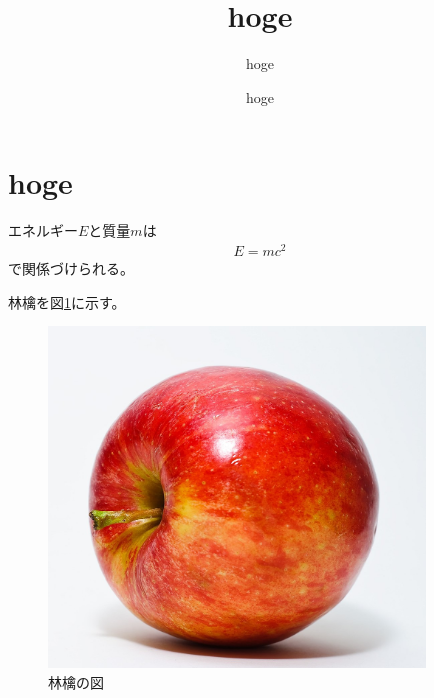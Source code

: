 \documentclass[uplatex]{jsarticle}
\title{hoge}
\author{hoge}
\date{hoge}
\begin{document}
\maketitle

\section{hoge}

エネルギー$E$と質量$m$は
\begin{align}
    E = mc^2
\end{align}
で関係づけられる。

林檎を図\ref{apple}に示す。

\begin{figure}
    \centering
    \includegraphics[width=10cm]{apple.jpg}
    \caption{林檎の図}
    \label{apple}
\end{figure}
\end{document}
